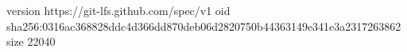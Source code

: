 version https://git-lfs.github.com/spec/v1
oid sha256:0316ac368828ddc4d366dd870deb06d2820750b44363149e341e3a2317263862
size 22040
